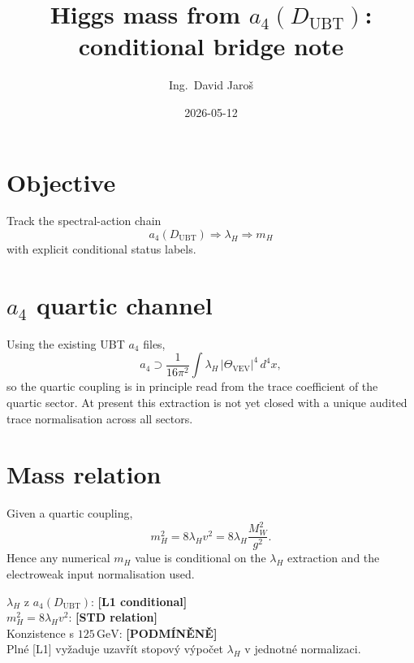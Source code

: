 \documentclass[12pt,a4paper]{article}
\title{Higgs mass from $a_4(D_{\mathrm{UBT}})$: conditional bridge note}
\author{Ing.\ David Jaroš}
\date{2026-05-12}
\begin{document}
\maketitle

\section{Objective}
Track the spectral-action chain
\[
a_4(D_{\mathrm{UBT}})\Rightarrow \lambda_H\Rightarrow m_H
\]
with explicit conditional status labels.

\section{$a_4$ quartic channel}
Using the existing UBT $a_4$ files,
\[
a_4 \supset \frac{1}{16\pi^2}\int \lambda_H\,|\Theta_{\mathrm{VEV}}|^4\,d^4x,
\]
so the quartic coupling is in principle read from the trace coefficient of the quartic sector.
At present this extraction is not yet closed with a unique audited trace normalisation across all sectors.

\section{Mass relation}
Given a quartic coupling,
\[
m_H^2 = 8\lambda_H v^2 = 8\lambda_H\frac{M_W^2}{g^2}.
\]
Hence any numerical $m_H$ value is conditional on the $\lambda_H$ extraction and the electroweak input normalisation used.

\begin{statusbox}
$\lambda_H$ z $a_4(D_{\mathrm{UBT}})$: \textbf{[L1 conditional]}\\
$m_H^2 = 8\lambda_H v^2$: \textbf{[STD relation]}\\
Konzistence s $125\,\mathrm{GeV}$: \textbf{[PODMÍNĚNĚ]}\\
Plné [L1] vyžaduje uzavřít stopový výpočet $\lambda_H$ v jednotné normalizaci.
\end{statusbox}
\end{document}
